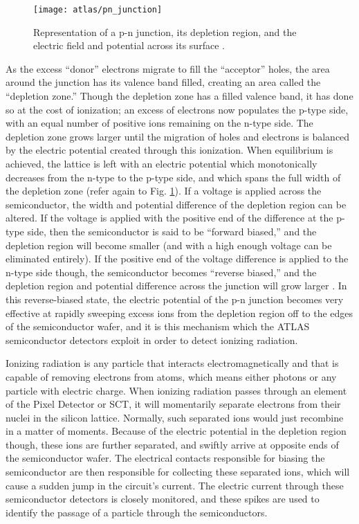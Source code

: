         \begin{figure}
            \texttt{[image: atlas/pn\_junction]}
            \caption{Representation of a p-n junction, its depletion region,
                and the electric field and potential across its surface \cite{Havránek:2317324}.}
            \label{fig:pn_junction}
        \end{figure}

        As the excess ``donor'' electrons migrate to fill the ``acceptor'' holes, the area around the junction has its valence band filled, creating an area called the ``depletion zone.''
        Though the depletion zone has a filled valence band, it has done so at the cost of ionization; an excess of electrons now populates the p-type side, with an equal number of positive ions remaining on the n-type side.
        The depletion zone grows larger until the migration of holes and electrons is balanced by the electric potential created through this ionization.
        When equilibrium is achieved, the lattice is left with an electric potential which monotonically decreases from the n-type to the p-type side, and which spans the full width of the depletion zone (refer again to Fig. \ref{fig:pn_junction}).
        If a voltage is applied across the semiconductor, the width and potential difference of the depletion region can be altered.
        If the voltage is applied with the positive end of the difference at the p-type side, then the semiconductor is said to be ``forward biased,'' and the depletion region will become smaller (and with a high enough voltage can be eliminated entirely).
        If the positive end of the voltage difference is applied to the n-type side though, the semiconductor becomes ``reverse biased,'' and the depletion region and potential difference across the junction will grow larger \cite{wiley_radiation_detection}.
        In this reverse-biased state, the electric potential of the p-n junction becomes very effective
            at rapidly sweeping excess ions from the depletion region off to the edges of the semiconductor wafer,
            and it is this mechanism which the ATLAS semiconductor detectors exploit in order to detect ionizing radiation.

        Ionizing radiation is any particle that interacts electromagnetically and that is capable of removing electrons from atoms,
            which means either photons or any particle with electric charge.
        When ionizing radiation passes through an element of the Pixel Detector or SCT, it will momentarily separate electrons from their nuclei in the silicon lattice.
        Normally, such separated ions would just recombine in a matter of moments.
        Because of the electric potential in the depletion region though, these ions are further separated, and swiftly arrive at opposite ends of the semiconductor wafer.
        The electrical contacts responsible for biasing the semiconductor are then responsible for collecting these separated ions, which will cause a sudden jump in the circuit's current.
        The electric current through these semiconductor detectors is closely monitored, and these spikes are used to identify the passage of a particle through the semiconductors.

